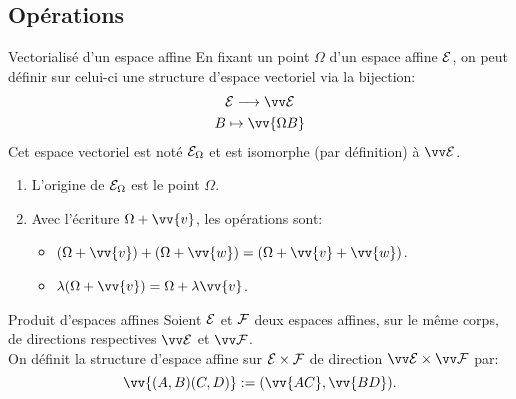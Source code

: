 \documentclass[bigger]{m53beamer}
\begin{document}
\subsection{Opérations}
  \begin{frame}{Vectorialisé d'un espace affine}
    En fixant un point $\Omega$ d'un espace affine $\mathcal{E}$, on peut définir sur celui-ci une structure d'espace vectoriel via la bijection:
    \begin{gather*}
      \ens{E} \longrightarrow \ev{E}\\
      B \mapsto \vv{\Omega B}
    \end{gather*}\pause
    Cet espace vectoriel est noté $\mathcal{E}_{\Omega}$ et est isomorphe (par définition) à $\ev{E}$.
    \begin{enumerate}[<+(1)->]
      \item L'origine de $\mathcal{E}_{\Omega}$ est le point $\Omega$.
      \item Avec l'écriture $\Omega+\vv{v}$, les opérations sont:
      \begin{itemize}[<+(1)->]
        \item $(\Omega+\vv{v})+(\Omega+\vv{w})=(\Omega+\vv{v}+\vv{w})$.
        \item $\lambda(\Omega+\vv{v})=\Omega+\lambda\vv{v}$.
      \end{itemize}
    \end{enumerate}
  \end{frame}
  \begin{frame}{Produit d'espaces affines}
    Soient $\mathcal{E}$ et $\mathcal{F}$ deux espaces affines, sur le même corps, de directions respectives $\ev{E}$ et $\ev{F}$.\\
    On définit la structure d'espace affine  sur $\mathcal{E} \times \mathcal{F}$ de direction $\ev{E} \times \ev{F}$ par:
    $$
      \vv{(A,B)(C,D)}:=(\vv{AC},\vv{BD}).
    $$
  \end{frame}
\end{document}
